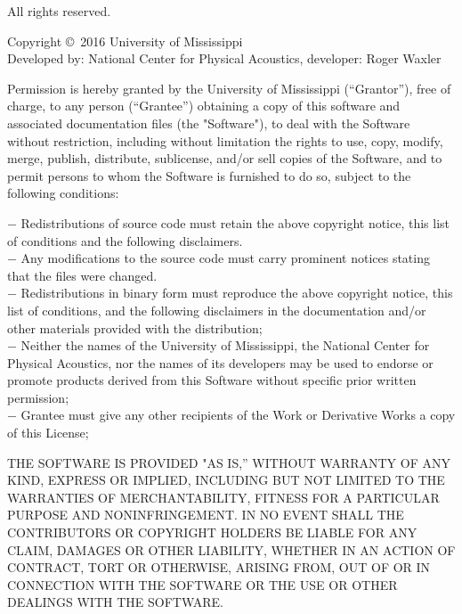 
\begin{flushleft}
\begin{footnotesize}

All rights reserved.

\vspace{5pt}

Copyright \copyright\ 2016 University of Mississippi\\
Developed by: National Center for Physical Acoustics, developer: Roger Waxler

Permission is hereby granted by the University of Mississippi (“Grantor”), free of charge, to any person (“Grantee”) obtaining a copy of this software and associated documentation files (the "Software"), to deal with the Software without restriction, including without limitation the rights to use, copy, modify, merge, publish, distribute, sublicense, and/or sell copies of the Software, and to permit persons to whom the Software is furnished to do so, subject to the following conditions:

$-$ Redistributions of source code must retain the above copyright notice, this list of conditions and the following disclaimers.\\
$-$ Any modifications to the source code must carry prominent notices stating that the files were changed.\\
$-$ Redistributions in binary form must reproduce the above copyright notice, this list of conditions, and the following disclaimers in the documentation and/or other materials provided with the distribution;\\
$-$ Neither the names of the University of Mississippi, the National Center for Physical Acoustics, nor the names of its developers may be used to endorse or promote products derived from this Software without specific prior written permission;\\
$-$ Grantee must give any other recipients of the Work or Derivative Works a copy of this License;

THE SOFTWARE IS PROVIDED "AS IS,” WITHOUT WARRANTY OF ANY KIND, EXPRESS OR IMPLIED, INCLUDING BUT NOT LIMITED TO THE WARRANTIES OF MERCHANTABILITY, FITNESS FOR A PARTICULAR PURPOSE AND NONINFRINGEMENT. IN NO EVENT SHALL THE CONTRIBUTORS OR COPYRIGHT HOLDERS BE LIABLE FOR ANY CLAIM, DAMAGES OR OTHER LIABILITY, WHETHER IN AN ACTION OF CONTRACT, TORT OR OTHERWISE, ARISING FROM, OUT OF OR IN CONNECTION WITH THE SOFTWARE OR THE USE OR OTHER DEALINGS WITH THE SOFTWARE.


\end{footnotesize}
\end{flushleft} 
